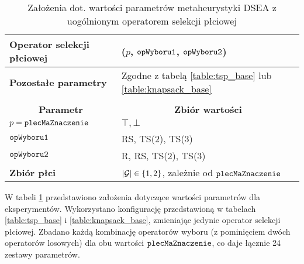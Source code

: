 \documentclass[./FM_mgr.tex]{subfiles}
\begin{document}
\begin{table}
	\caption{Założenia dot. wartości parametrów  metaheurystyki DSEA z uogólnionym operatorem selekcji płciowej \label{table:dsea_general}}
	\centering
	\begin{tabularx}{\linewidth}{lX}
		\hline
		\multicolumn{1}{|l|}{\textbf{Operator selekcji płciowej}} &
		\multicolumn{1}{l|}{\opName{stdGenSel}($p$, $\mathtt{opWyboru1}$, $\mathtt{opWyboru2}$)} \\ 
		\hline
		\multicolumn{1}{|l|}{\textbf{Pozostałe parametry}} &
		\multicolumn{1}{l|}{Zgodne z tabelą \ref{table:tsp_base} lub \ref{table:knapsack_base}} \\ 
		\hline
		& \\ 
		\hline
		\multicolumn{1}{|c|}{\textbf{Parametr}} & 
		\multicolumn{1}{c|}{\textbf{Zbiór wartości}} \\ 
		\hline \hline
		\multicolumn{1}{|l|}{$p = \mathtt{plecMaZnaczenie}$} & 
		\multicolumn{1}{l|}{$\top, \bot$} \\
		\hline
		\multicolumn{1}{|l|}{$\mathtt{opWyboru1}$} & 
		\multicolumn{1}{l|}{RS, TS(2), TS(3)} \\ 
		\hline
		\multicolumn{1}{|l|}{$\mathtt{opWyboru2}$} & 
		\multicolumn{1}{l|}{R, RS, TS(2), TS(3)} \\
		\hline
		\multicolumn{1}{|l|}{\textbf{Zbiór płci}} & 
		\multicolumn{1}{l|}{ $|\mathcal{G}| \in \{1, 2\}$, zależnie od $\mathtt{plecMaZnaczenie}$ } \\ 
		\hline
	\end{tabularx}
\end{table}

W tabeli \ref{table:dsea_general} przedstawiono założenia dotyczące wartości parametrów dla eksperymentów.
Wykorzystano konfigurację przedstawioną w tabelach \ref{table:tsp_base} i \ref{table:knapsack_base}, zmieniając jedynie operator selekcji płciowej.
Zbadano każdą kombinację operatorów wyboru (z pominięciem dwóch operatorów losowych) dla obu wartości $\mathtt{plecMaZnaczenie}$, co daje łącznie 24 zestawy parametrów.
\end{document}
